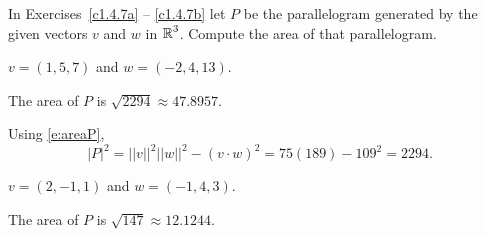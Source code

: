 \documentclass{ximera}
\begin{document}
\noindent In Exercises~\ref{c1.4.7a} -- \ref{c1.4.7b} let $P$ be the 
parallelogram generated by the given vectors $v$ and $w$ in $\mbox{$\Bbb{R}$}^3$.  
Compute the area of that parallelogram.
\begin{exercise} \label{c1.4.7a}
$v=(1,5,7)$ and $w=(-2,4,13)$.

\begin{solution}
\ans The area of $P$ is $\sqrt{2294} \approx 47.8957$.

\soln Using \eqref{e:areaP},
\[
|P|^2 = ||v||^2||w||^2 - (v \cdot w)^2 = 75(189) - 109^2 = 2294.
\]

\end{solution}
\end{exercise}
\begin{exercise} \label{c1.4.7b}
$v=(2,-1,1)$ and $w=(-1,4,3)$.

\begin{solution}
\ans The area of $P$ is $\sqrt{147} \approx 12.1244$.



\end{solution}
\end{exercise}
\end{document}
